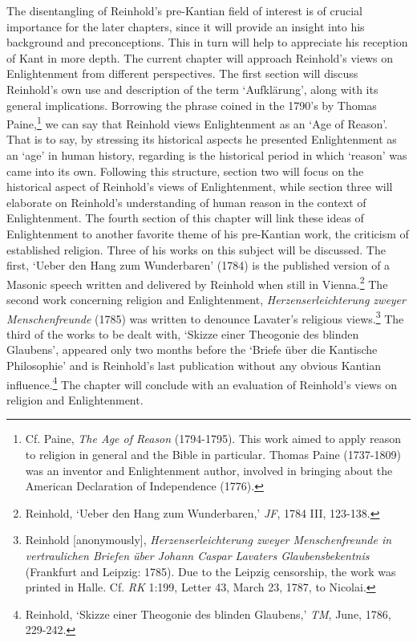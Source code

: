 The disentangling of Reinhold's pre{-}Kantian field of interest is of crucial importance for the later chapters, since it will provide an insight into his background and preconceptions. This in turn will help to appreciate his reception of Kant in more depth. The current chapter will approach Reinhold's views on Enlightenment from different perspectives. The first section will discuss Reinhold's own use and description of the term `Aufkl\"{a}rung', along with its general implications. Borrowing the phrase coined in the 1790's by Thomas Paine,\footnote{ Cf. Paine, \textit{The Age of Reason} (1794{-}1795). This work aimed to apply reason to religion in general and the Bible in particular. Thomas Paine (1737{-}1809) was an inventor and Enlightenment author, involved in bringing about the American Declaration of Independence (1776). } we can say that Reinhold views Enlightenment as an `Age of Reason'. That is to say, by stressing its historical aspects he presented Enlightenment as an `age' in human history, regarding is the historical period in which `reason' was came into its own. Following this structure, section two will focus on the historical aspect of Reinhold's views of Enlightenment, while section three will elaborate on Reinhold's understanding of human reason in the context of Enlightenment. The fourth section of this chapter will link these ideas of Enlightenment to another favorite theme of his pre{-}Kantian work, the criticism of established religion. Three of his works on this subject will be discussed. The first, `Ueber den Hang zum Wunderbaren' (1784) is the published version of a Masonic speech written and delivered by Reinhold when still in Vienna.\footnote{ Reinhold, `Ueber den Hang zum Wunderbaren,' \textit{JF}, 1784 III, 123{-}138.} The second work concerning religion and Enlightenment, \textit{Herzenserleichterung zweyer Menschenfreunde }(1785) was written to denounce Lavater's religious views.\footnote{ Reinhold [anonymously], \textit{Herzenserleichterung zweyer Menschenfreunde in vertraulichen Briefen \"{u}ber Johann Caspar Lavaters Glaubensbekentnis} (Frankfurt and Leipzig: 1785). Due to the Leipzig censorship, the work was printed in Halle. Cf. \textit{RK} 1:199, Letter 43, March 23, 1787, to Nicolai. } The third of the works to be dealt with, `Skizze einer Theogonie des blinden Glaubens', appeared only two months before the `Briefe \"{u}ber die Kantische Philosophie' and is Reinhold's last publication without any obvious Kantian influence.\footnote{ Reinhold, `Skizze einer Theogonie des blinden Glaubens,' \textit{TM}, June, 1786, 229{-}242. } The chapter will conclude with an evaluation of Reinhold's views on religion and Enlightenment. 


